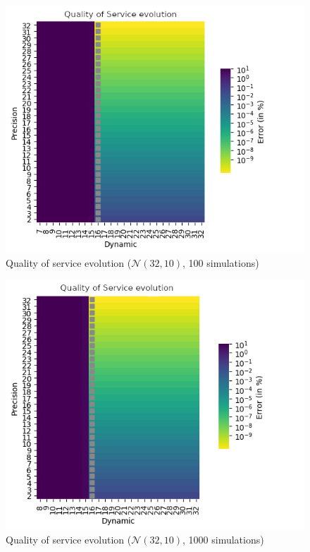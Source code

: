 \begin{figure}
    \centering
    \includegraphics[width=.8\textwidth]{Figures/results/d2-32_p2-32_e8-8_N32-10_s100-0.png}
    \caption{Quality of service evolution ($\mathcal{N}(32, 10)$, 100 simulations)}
    \label{app.quick:fig.qos32-10-100}
\end{figure}
\begin{figure}
    \centering
    \includegraphics[width=.8\textwidth]{Figures/results/d2-32_p2-32_e8-8_N32-10_s1000-0.png}
    \caption{Quality of service evolution ($\mathcal{N}(32, 10)$, 1000 simulations)}
    \label{app.quick:fig.qos32-10-1000}
\end{figure}
